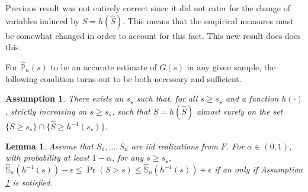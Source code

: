 \documentclass[a4paper,11pt]{article}
\newtheorem{assumption}{Assumption}
\newtheorem{lemma}{Lemma}
\begin{document}
{\color{blue} Previous result was not entirely correct since it did not cater for the change  of variables induced by $S=h(\widehat{S})$. This means that the empirical measures must be somewhat changed in order to account for this fact. This new result does does this.}

For $\widehat{\mathbb{P}}_n(s)$ to be an accurate estimate of $G(s)$ in any given sample, the following condition turns out to be both necessary and sufficient.
\begin{assumption}\label{ass:empirical_pis}
There exists an $s_\star$ such that, for all $s\ge s_\star$ and a function $h(\cdot)$, strictly increasing on $s\ge s_\star$, such that $S=h(\widehat{S})$ almost surely on the set $\{S\ge s_\star\}\cap\{\widehat{S}\ge h^{-1}(s_\star)\}$. 
\end{assumption}
\begin{lemma}\label{lem:confident}
Assume that $S_1,\dots, S_n$ are iid realizations from $F$. For $\alpha \in(0,1)$, with probability at least $1-\alpha$, for any $s \ge s_\star$, $\widehat{\mathbb{S}}_n(h^{-1}(s))-\epsilon \leq \Pr(S>s) \leq \widehat{\mathbb{S}}_n(h^{-1}(s))+\epsilon$ if an only if Assumption \ref{ass:empirical_pis} is satisfied.
\end{lemma}
\end{document}
